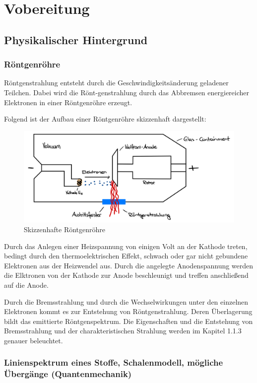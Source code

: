\documentclass{article}
\begin{document}
\newpage

\section{Vobereitung}

\subsection{Physikalischer Hintergrund}

\subsubsection{Röntgenröhre}

\cite{medp}

Röntgenstrahlung entsteht durch die Geschwindigkeitsänderung geladener Teilchen. Dabei wird die Rönt-genstrahlung durch das Abbremsen energiereicher Elektronen in einer Röntgenröhre erzeugt.

Folgend ist der Aufbau einer Röntgenröhre skizzenhaft dargestellt:

\begin{figure}[H]
    \centering
    \includegraphics[width=0.7\linewidth]{Abbildungen/Röntgenröhre.pdf}
    \caption{Skizzenhafte Röntgenröhre}
\end{figure}

Durch das Anlegen einer Heizspannung von einigen Volt an der Kathode treten, bedingt durch den thermoelektrischen Effekt, schwach oder gar nicht gebundene Elektronen aus der Heizwendel aus. Durch die angelegte Anodenspannung werden die Elktronen von der Kathode zur Anode beschleunigt und treffen anschließend auf die Anode.

Durch die Bremsstrahlung und durch die Wechselwirkungen unter den einzelnen Elektronen kommt es zur Entstehung von Röntgenstrahlung. Deren Überlagerung bildt das emittierte Röntgenspektrum. Die Eigenschaften und die Entstehung von Bremsstrahlung und der charakteristischen Strahlung werden im Kapitel 1.1.3 genauer beleuchtet. 

\subsubsection{Linienspektrum eines Stoffe, Schalenmodell, mögliche Übergänge (Quantenmechanik)}
\end{document}
